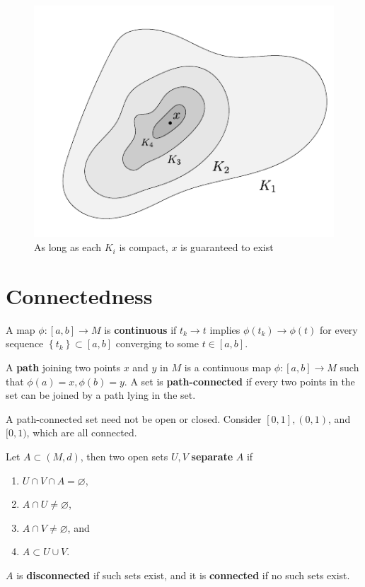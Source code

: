 \documentclass[10pt]{report}
\begin{document}
\begin{figure}[H]
	\centering
	\includegraphics[scale=1]{fig/nested-set.pdf}
	\caption{As long as each $K_i$ is compact, $x$ is guaranteed to exist}
\end{figure}


\section{Connectedness}

\begin{defn}[]
	A map $\phi:[a,b]\to M$ is \textbf{continuous} if $t_k \to t$ implies $\phi(t_k) \to \phi(t)$ for every sequence $\left\{ t_k \right\} \subset [a,b]$ converging to some $t \in [a,b]$.
\end{defn}

\begin{defn}[]
	A \textbf{path} joining two points $x $ and $y$ in $M$ is a continuous map $\phi:[a,b] \to M$ such that $\phi(a)=x, \phi(b)=y$. A set is \textbf{path-connected} if every two points in the set can be joined by a path lying in the set.
\end{defn}

A path-connected set need not be open or closed. Consider $[0,1], (0,1)$, and $[0,1)$, which are all connected.

\begin{defn}[]
	Let $A \subset (M,d)$, then two open sets $U,V$ \textbf{separate} $A$ if
	\begin{enumerate}
		\item $U \cap V \cap A = \varnothing$,
		\item $A \cap U \neq \varnothing$,
		\item $A \cap V \neq \varnothing$, and
		\item $A \subset U \cup V$.
	\end{enumerate}
	$A$ is \textbf{disconnected} if such sets exist, and it is \textbf{connected} if no such sets exist.
\end{defn}
\end{document}
